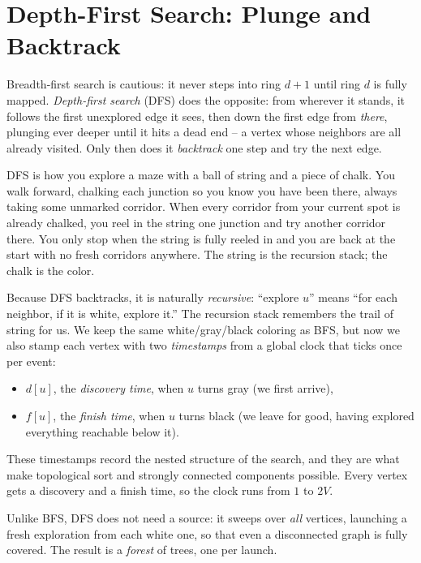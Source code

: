 \section{Depth-First Search: Plunge and Backtrack}
\label{ch22:dfs}

Breadth-first search is cautious: it never steps into ring $d+1$ until ring $d$
is fully mapped. \emph{Depth-first search} (DFS) does the opposite: from
wherever it stands, it follows the first unexplored edge it sees, then down the first edge from \emph{there}, plunging
ever deeper until it hits a dead end -- a vertex whose neighbors are all already
visited. Only then does it \emph{backtrack} one step and try the next edge.

\begin{intuitionbox}
DFS is how you explore a maze with a ball of string and a piece of chalk. You
walk forward, chalking each junction so you know you have been there, always
taking some unmarked corridor. When every corridor from your current spot is
already chalked, you reel in the string one junction and try another corridor
there. You only stop when the string is fully reeled in and you are back at the
start with no fresh corridors anywhere. The string is the recursion stack; the
chalk is the color.
\end{intuitionbox}

Because DFS backtracks, it is naturally \emph{recursive}: ``explore $u$'' means
``for each neighbor, if it is white, explore it.'' The recursion stack remembers
the trail of string for us. We keep the same white/gray/black coloring as BFS,
but now we also stamp each vertex with two \emph{timestamps} from a global clock
that ticks once per event:
\begin{itemize}
\item $d[u]$, the \emph{discovery time}, when $u$ turns gray (we first arrive),
\item $f[u]$, the \emph{finish time}, when $u$ turns black (we leave for good,
having explored everything reachable below it).
\end{itemize}
These timestamps record the nested structure of the search, and they are what
make topological sort and strongly connected
components possible. Every vertex gets a discovery and a finish time, so the
clock runs from $1$ to $2V$.

Unlike BFS, DFS does not need a source: it sweeps over \emph{all} vertices,
launching a fresh exploration from each white one, so that even a disconnected
graph is fully covered. The result is a \emph{forest} of trees, one per launch.

